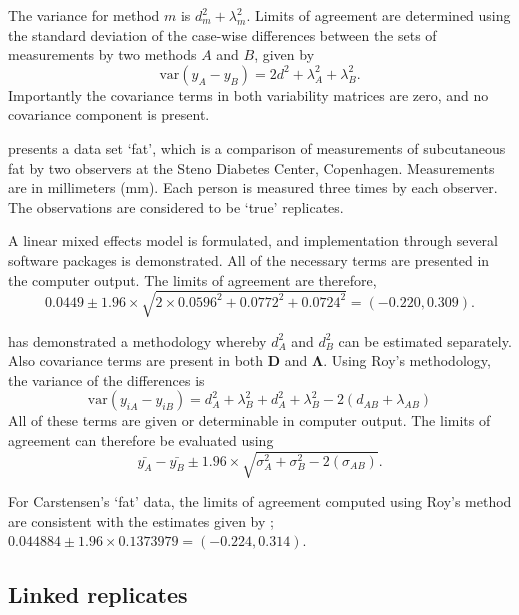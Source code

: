\documentclass[12pt, a4paper]{report}
\theoremstyle{plain}
\theoremstyle{definition}
\theoremstyle{remark}
\begin{document}
The variance for method $m$ is $d^2_{m}+\lambda^2_{m}$. Limits of agreement are determined using the standard deviation of the case-wise differences between the sets of measurements by two methods $A$ and $B$, given by
\begin{equation}
\mbox{var} (y_{A}-y_{B}) = 2d^2 + \lambda^2_{A}+ \lambda^2_{B}.
\end{equation}
Importantly the covariance terms in both variability matrices are zero, and no covariance component is present.

\citet{BXC2008} presents a data set `fat', which is a comparison of measurements of subcutaneous fat
by two observers at the Steno Diabetes Center, Copenhagen. Measurements are in millimeters
(mm). Each person is measured three times by each observer. The observations are considered to be `true' replicates.

A linear mixed effects model is formulated, and implementation through several software packages is demonstrated.
All of the necessary terms are presented in the computer output. The limits of agreement are therefore,
\begin{equation}
0.0449  \pm 1.96 \times  \sqrt{2 \times 0.0596^2 + 0.0772^2 + 0.0724^2} = (-0.220,  0.309).
\end{equation}

\citet{roy} has demonstrated a methodology whereby $d^2_{A}$ and $d^2_{B}$ can be estimated separately. Also covariance terms are present in both $\boldsymbol{D}$ and $\boldsymbol{\Lambda}$. Using Roy's methodology, the variance of the differences is
\begin{equation}
\mbox{var} (y_{iA}-y_{iB})= d^2_{A} + \lambda^2_{B} + d^2_{A} + \lambda^2_{B} - 2(d_{AB} + \lambda_{AB})
\end{equation}
All of these terms are given or determinable in computer output.
The limits of agreement can therefore be evaluated using
\begin{equation}
\bar{y_{A}}-\bar{y_{B}} \pm 1.96 \times \sqrt{ \sigma^2_{A} + \sigma^2_{B}  - 2(\sigma_{AB})}.
\end{equation}

For Carstensen's `fat' data, the limits of agreement computed using Roy's
method are consistent with the estimates given by \citet{BXC2008}; $0.044884  \pm 1.96 \times  0.1373979 = (-0.224,  0.314).$

\subsection{Linked replicates}
\end{document}
